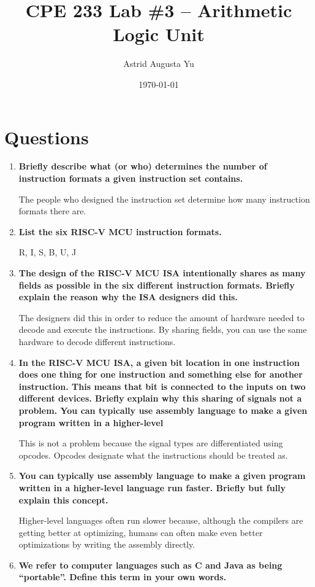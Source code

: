\documentclass{article}
\author{Astrid Augusta Yu}
\title{CPE 233 Lab \#3 -- Arithmetic Logic Unit}
\date{\today}
\begin{document}
\maketitle

\section{Questions}

\begin{enumerate}
    \item \textbf{Briefly describe what (or who) determines the number 
    of instruction formats a given instruction set contains. }
    
    The people who designed the instruction set determine how many instruction formats 
    there are. 

    \item \textbf{List the six RISC-V MCU instruction formats. }
    
    R, I, S, B, U, J
    \item \textbf{The design of the RISC-V MCU ISA intentionally shares as many fields as possible in the six
    different instruction formats. Briefly explain the reason why the ISA designers did this.  }
    
    The designers did this in order to reduce the amount of hardware 
        needed to decode and execute the instructions. By sharing fields,
        you can use the same hardware to decode different instructions.
    \item \textbf{In the RISC-V MCU ISA, a given bit location in one instruction does one thing for one
    instruction and something else for another instruction. This means that bit is connected to the
    inputs on two different devices. Briefly explain why this sharing of signals not a problem.
     You can typically use assembly language to make a given program written in a higher-level }
    
    This is not a problem because the signal types are differentiated
        using opcodes. Opcodes designate what the instructions should be
        treated as.
    \item \textbf{You can typically use assembly language to make a given program written in a higher-level
    language run faster. Briefly but fully explain this concept.  }
    
    Higher-level languages often run slower because, although the 
        compilers are getting better at optimizing, humans can often make even 
        better optimizations by writing the assembly directly.
    \item \textbf{We refer to computer languages such as C and Java as being “portable”. Define this term in your
    own words.  }
    

\end{enumerate}
\end{document}
